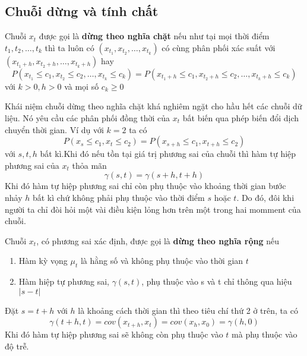\subsection{Chuỗi dừng và tính chất}
\begin{defi}
	Chuỗi $x_t$ được gọi là \textbf{dừng theo nghĩa chặt}\citep{tsa3} nếu như tại mọi thời điểm $t_1,t_2,\dots,t_k$ thì ta luôn có $(x_{t_1},x_{t_2},\dots,x_{t_k})$ có cùng phân phối xác suất với $(x_{t_1+h},x_{t_2+h},\dots,x_{t_k+h})$ hay
	\begin{equation}
		P(x_{t_1} \leq c_1,x_{t_2} \leq c_2,\dots,x_{t_k} \leq c_k) = P(x_{t_1+h} \leq c_1,x_{t_2+h} \leq c_2,\dots,x_{t_k+h} \leq c_k)
	\end{equation}
	với $k > 0 , h > 0$ và mọi số $c_k \geq 0$
\end{defi}
Khái niệm chuỗi dừng theo nghĩa chặt khá nghiêm ngặt cho hầu hết các chuỗi dữ liệu. Nó yêu cầu các phân phối đồng thời của $x_t$ bất biến qua phép biến đổi dịch chuyển thời gian. Ví dụ với $k=2$ ta có 
\begin{equation}
 P(x_s \leq c_1,x_t \leq c_2) = P(x_{s+h} \leq c_1,x_{t+h} \leq c_2)
\end{equation} với $s,t,h$ bất kì.Khi đó nếu tồn tại giá trị phương sai của chuỗi thì hàm tự hiệp phương sai của $x_t$ thỏa mãn 
\begin{equation}
	\gamma(s,t) = \gamma(s+h,t+h)
\end{equation}
Khi đó hàm tự hiệp phương sai chỉ còn phụ thuộc vào khoảng thời gian bước nhảy $h$ bất kì chứ không phải phụ thuộc vào thời điểm $s$ hoặc $t$. Do đó, đôi khi người ta chỉ đòi hỏi một vài điều kiện lỏng hơn trên một trong hai momment của chuỗi. 
 \begin{defi}
  Chuỗi $x_t$, có phương sai xác định, được gọi là \textbf{dừng theo nghĩa rộng} \citep{tsa3} nếu
  \begin{enumerate}
  \item Hàm kỳ vọng $\mu_t$ là hằng số và không phụ thuộc vào thời gian $t$
  \item Hàm hiệp tự phương sai, $\gamma(s,t)$, phụ thuộc vào s và t chỉ thông qua hiệu $|s-t|$ 
  \end{enumerate}
 \end{defi}
 Đặt $s=t+h$ với $h$ là khoảng cách thời gian thì theo tiêu chí thứ 2 ở trên, ta có
 \begin{equation}
 \gamma(t+h,t) = cov(x_{t+h},x_t) = cov(x_h,x_0) = \gamma(h,0)
 \end{equation}
 Khi đó hàm tự hiệp phương sai sẽ không còn phụ thuộc vào $t$ mà phụ thuộc vào độ trễ.
 
